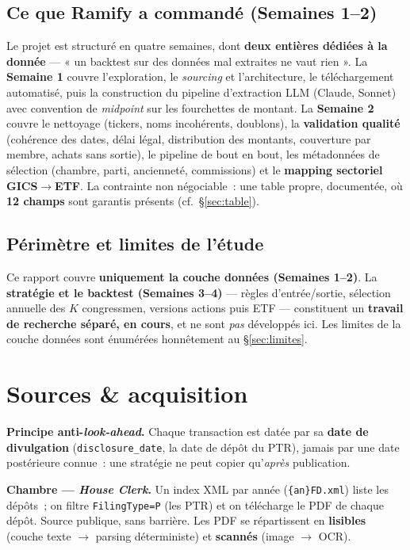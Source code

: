 \documentclass[11pt,a4paper]{article}
\newcommand{\co}[1]{\texttt{\small #1}}
\begin{document}
\subsection{Ce que Ramify a commandé (Semaines 1--2)}
Le projet est structuré en quatre semaines, dont \textbf{deux entières dédiées à la donnée} — « un
backtest sur des données mal extraites ne vaut rien ». La \textbf{Semaine 1} couvre l'exploration, le
\emph{sourcing} et l'architecture, le téléchargement automatisé, puis la construction du pipeline
d'extraction LLM (Claude, Sonnet) avec convention de \emph{midpoint} sur les fourchettes de montant. La
\textbf{Semaine 2} couvre le nettoyage (tickers, noms incohérents, doublons), la \textbf{validation
qualité} (cohérence des dates, délai légal, distribution des montants, couverture par membre, achats
sans sortie), le pipeline de bout en bout, les métadonnées de sélection (chambre, parti, ancienneté,
commissions) et le \textbf{mapping sectoriel GICS$\rightarrow$ETF}. La contrainte non négociable~: une
table propre, documentée, où \textbf{12 champs} sont garantis présents (cf.~§\ref{sec:table}).

\subsection{Périmètre et limites de l'étude}
Ce rapport couvre \textbf{uniquement la couche données (Semaines 1--2)}. La \textbf{stratégie et le
backtest (Semaines 3--4)} — règles d'entrée/sortie, sélection annuelle des $K$ congressmen, versions
actions puis ETF — constituent un \textbf{travail de recherche séparé, en cours}, et ne sont
\emph{pas} développés ici. Les limites de la couche données sont énumérées honnêtement au §\ref{sec:limites}.

\section{Sources \& acquisition}

\textbf{Principe anti-\emph{look-ahead}.} Chaque transaction est datée par sa \textbf{date de
divulgation} (\co{disclosure_date}, la date de dépôt du PTR), jamais par une date postérieure connue~:
une stratégie ne peut copier qu'\emph{après} publication.

\textbf{Chambre — \emph{House Clerk}.} Un index XML par année (\co{\{an\}FD.xml}) liste les dépôts~; on
filtre \co{FilingType=P} (les PTR) et on télécharge le PDF de chaque dépôt. Source publique, sans
barrière. Les PDF se répartissent en \textbf{lisibles} (couche texte $\rightarrow$ parsing déterministe)
et \textbf{scannés} (image $\rightarrow$ OCR).
\end{document}
